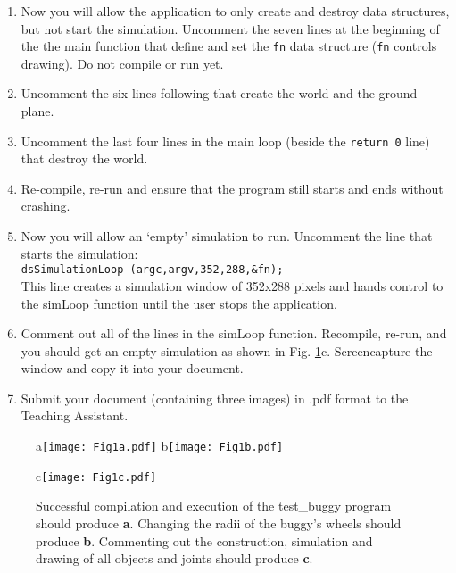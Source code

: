 \documentclass[12pt]{article}
\begin{document}
\begin{enumerate}
\item Now you will allow the application to only create and destroy data structures, but not start the simulation. Uncomment the seven lines at the beginning of the the main function that define and set the \texttt{fn} data structure (\texttt{fn} controls drawing). Do not compile or run yet.

\item Uncomment the six lines following that create the world and the ground plane.

\item Uncomment the last four lines in the main loop (beside the \texttt{return 0} line) that destroy the world.

\item Re-compile, re-run and ensure that the program still starts and ends without crashing.

\item Now you will allow an `empty' simulation to run. Uncomment the line that starts the simulation:\\
\texttt{dsSimulationLoop (argc,argv,352,288,\&fn);}\\
This line creates a simulation window of 352x288 pixels and hands control to the simLoop function until the user stops the application.

\item Comment out all of the lines in the simLoop function. Recompile, re-run, and you should get an empty simulation as shown in Fig. \ref{Fig}c. Screencapture the window and copy it into your document.

\item Submit your document (containing three images) in .pdf format to the Teaching Assistant.

\end{enumerate}

\begin{figure}[!t]
\centerline{
a\texttt{[image: Fig1a.pdf]}
b\texttt{[image: Fig1b.pdf]}
}
\centerline{
c\texttt{[image: Fig1c.pdf]}
}
\caption{
Successful compilation and execution of the test\_buggy program should produce \textbf{a}.
Changing the radii of the buggy's wheels should produce \textbf{b}.
Commenting out the construction, simulation and drawing of all objects and joints should produce \textbf{c}.}
\label{Fig}
\end{figure}
\end{document}
